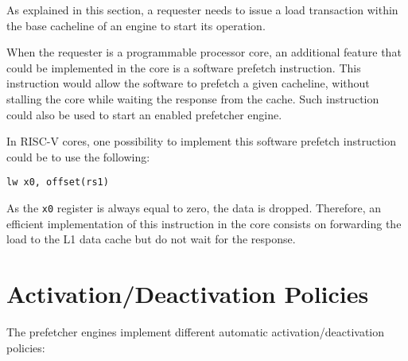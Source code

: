 \documentclass[10pt,titlepage,twoside]{book}
\begin{document}
\begin{tcolorbox}[colbacktitle=green!50!black,
                  colback=green!10!white,
                  colframe=green!50!black,
                  title=\textbf{Programming note},
                  center, valign=top, halign=justify,
                  center title,
                  width=.950\linewidth]

As explained in this section, a requester needs to issue a load transaction within the base cacheline of an engine to start its operation.

When the requester is a programmable processor core, an additional feature that could be implemented in the core is a software prefetch instruction.
This instruction would allow the software to prefetch a given cacheline, without stalling the core while waiting the response from the cache.
Such instruction could also be used to start an enabled prefetcher engine.

In RISC-V cores, one possibility to implement this software prefetch instruction could be to use the following:

\vspace{.8em}

\begin{verbatim}
lw x0, offset(rs1)
\end{verbatim}

\vspace{.8em}

As the \verb|x0| register is always equal to zero, the data is dropped.
Therefore, an efficient implementation of this instruction in the core consists on forwarding the load to the L1 data cache but do not wait for the response.
\end{tcolorbox}

\section{Activation/Deactivation Policies}

The prefetcher engines implement different automatic activation/deactivation policies:
\end{document}
